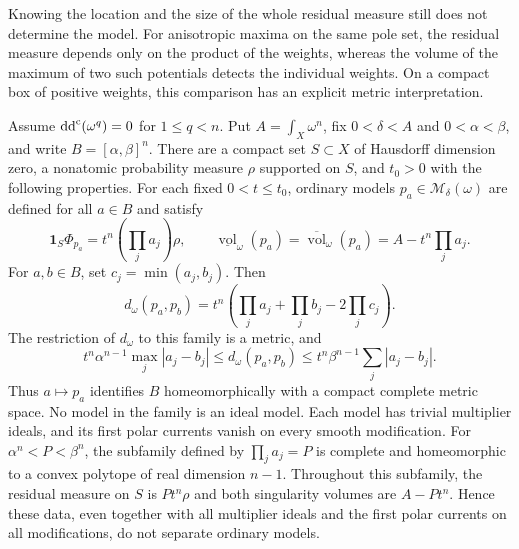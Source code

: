 Knowing the location and the size of the whole residual measure still does not determine the model. For anisotropic maxima on the same pole set, the residual measure depends only on the product of the weights, whereas the volume of the maximum of two such potentials detects the individual weights. On a compact box of positive weights, this comparison has an explicit metric interpretation.

\begin{proposition}\label{prop:equal-residual-anisotropic-models}
Assume $\mathrm{dd}^{\mathrm{c}}(\omega^q)=0$ for $1\leq q<n$. Put $A=\int_X\omega^n$, fix $0<\delta<A$ and $0<\alpha<\beta$, and write $B=[\alpha,\beta]^n$. There are a compact set $S\subset X$ of Hausdorff dimension zero, a nonatomic probability measure $\rho$ supported on $S$, and $t_0>0$ with the following properties. For each fixed $0<t\leq t_0$, ordinary models $p_a\in\mathcal M_\delta(\omega)$ are defined for all $a\in B$ and satisfy
\[
 \mathbf1_S\Phi_{p_a}=t^n\left(\prod_j a_j\right)\rho,
 \qquad
 \underline{\operatorname{vol}}_\omega(p_a)
 =\overline{\operatorname{vol}}_\omega(p_a)
 =A-t^n\prod_j a_j.
\]
For $a,b\in B$, set $c_j=\min(a_j,b_j)$. Then
\[
 d_\omega(p_a,p_b)
 =t^n\left(\prod_j a_j+\prod_j b_j-2\prod_j c_j\right).
\]
The restriction of $d_\omega$ to this family is a metric, and
\[
 t^n\alpha^{n-1}\max_j|a_j-b_j|
 \leq d_\omega(p_a,p_b)
 \leq t^n\beta^{n-1}\sum_j|a_j-b_j|.
\]
Thus $a\mapsto p_a$ identifies $B$ homeomorphically with a compact complete metric space. No model in the family is an ideal model. Each model has trivial multiplier ideals, and its first polar currents vanish on every smooth modification. For $\alpha^n<P<\beta^n$, the subfamily defined by $\prod_j a_j=P$ is complete and homeomorphic to a convex polytope of real dimension $n-1$. Throughout this subfamily, the residual measure on $S$ is $Pt^n\rho$ and both singularity volumes are $A-Pt^n$. Hence these data, even together with all multiplier ideals and the first polar currents on all modifications, do not separate ordinary models.
\end{proposition}
